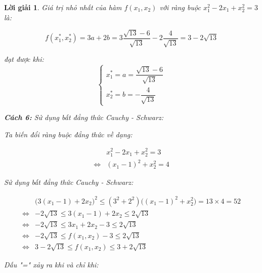 \documentclass[14pt, a4paper]{article}
\theoremstyle{sltheorem}
\theoremstyle{soltheorem}
\newtheorem*{loigiai}{Lời giải}
\begin{document}
\begin{loigiai}
        Giá trị nhỏ nhất của hàm $f(x_1, x_2)$ với ràng buộc $x_1^2 - 2x_1 + x_2^2 = 3$ là:

        \begin{equation*}
            f(x_1^*, x_2^*) = 3 a + 2b = 3 \dfrac{\sqrt{13} - 6}{\sqrt{13}} - 2 \dfrac{4}{\sqrt{13}}  = 3 - 2\sqrt{13}
        \end{equation*}

        đạt được khi:
        \begin{equation*}
            \begin{cases} 
                x_1^* = a = \dfrac{\sqrt{13} - 6}{\sqrt{13}} \\ 
                x_2^* = b = - \dfrac{4}{\sqrt{13}} 
            \end{cases}
        \end{equation*}

        \textbf{Cách 6:} Sử dụng bất đẳng thức Cauchy - Schwarz:

        Ta biến đổi ràng buộc đẳng thức về dạng:

        \begin{equation*}
            \begin{aligned}
            &x_1^2 - 2x_1 + x_2^2 = 3 \\
            \Leftrightarrow & (x_1 - 1)^2 + x_2^2 = 4
            \end{aligned}
        \end{equation*}

        Sử dụng bất đẳng thức Cauchy - Schwarz:

        \begin{equation*}
            \begin{aligned}
            &\Big ( 3(x_1 - 1) + 2x_2 \Big )^2 \leq (3^2 + 2^2)\Big ( (x_1 - 1)^2 + x_2^2 \Big) = 13\times4 = 52 \\
            \Leftrightarrow & - 2\sqrt{13} \leq 3(x_1 - 1) + 2x_2 \leq 2 \sqrt{13} \\
            \Leftrightarrow & - 2 \sqrt{13} \leq 3 x_1 + 2 x_2 - 3 \leq 2 \sqrt{13} \\
            \Leftrightarrow & - 2 \sqrt{13} \leq f(x_1, x_2) - 3 \leq 2 \sqrt{13} \\
            \Leftrightarrow & 3 - 2 \sqrt{13} \leq f(x_1, x_2) \leq 3 + 2 \sqrt{13}
            \end{aligned}
        \end{equation*}

        Dấu "=" xảy ra khi và chỉ khi:


\end{loigiai}
\end{document}
